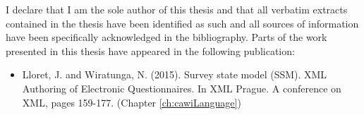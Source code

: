 	I declare that I am the sole author of this thesis and that all verbatim extracts contained in the thesis have been identified as such and all sources of information have been specifically acknowledged in the bibliography. Parts of the work presented in this thesis have appeared in the following publication:

	\begin{itemize}
		\item Lloret, J. and Wiratunga, N. (2015). Survey state model (SSM). XML Authoring of Electronic Questionnaires. In XML Prague. A conference on XML, pages 159-177. (Chapter \ref{ch:cawiLanguage})
	\end{itemize}